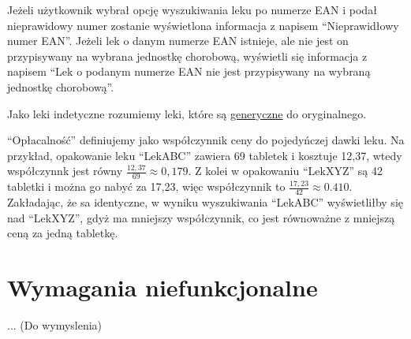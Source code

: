 \documentclass{article}
\begin{document}
  Jeżeli użytkownik wybrał opcję wyszukiwania leku po numerze EAN i podał nieprawidowy numer zostanie wyświetlona informacja z napisem
  ``Nieprawidłowy numer EAN''.
  Jeżeli lek o danym numerze EAN istnieje, ale nie jest on przypisywany na wybrana jednostkę chorobową, wyświetli się informacja z napisem
  ``Lek o podanym numerze EAN nie jest przypisywany na wybraną jednostkę chorobową''.

  Jako leki indetyczne rozumiemy leki, które są
  \href{https://www.eupati.eu/pl/rodzaje-lekow/leki-generyczne/}{generyczne} do oryginalnego.

  ``Opłacalność'' definiujemy jako współczynnik ceny do pojedyńczej dawki leku.
  Na przykład, opakowanie leku ``LekABC'' zawiera 69 tabletek i kosztuje 12,37, wtedy współczynnk jest równy $\frac{12,37}{69} \approx 0,179$.
  Z kolei w opakowaniu ``LekXYZ'' są 42 tabletki i można go nabyć za 17,23, więc współczynnik to $\frac{17,23}{42} \approx 0.410$.
  Zakładając, że sa identyczne, w wyniku wyszukiwania ``LekABC'' wyświetliłby się nad ``LekXYZ'', gdyż ma mniejszy współczynnik,
  co jest równoważne z mniejszą ceną za jedną tabletkę.

  \section{Wymagania niefunkcjonalne}

  ... (Do wymyslenia)
\end{document}
